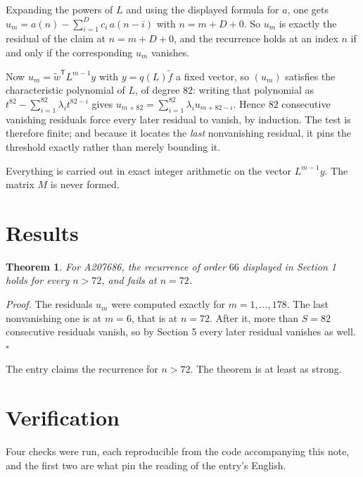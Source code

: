 \documentclass[11pt]{article}
\newtheorem{theorem}{Theorem}
\theoremstyle{definition}
\begin{document}
Expanding the powers of $L$ and using the displayed formula for $a$, one gets $u_m = a(n) - \sum_{i=1}^{D} c_i\,a(n-i)$ with $n = m + D + 0$. So $u_m$ is exactly the residual of the claim at $n = m + D + 0$, and the recurrence holds at an index $n$ if and only if the corresponding $u_m$ vanishes.

Now $u_m = \tilde w^{\mathsf T} L^{m-1} y$ with $y = q(L)\tilde f$ a fixed vector, so $(u_m)$ satisfies the characteristic polynomial of $L$, of degree $82$: writing that polynomial as $t^{82} - \sum_{i=1}^{82} \lambda_i t^{82-i}$ gives $u_{m+82} = \sum_{i=1}^{82} \lambda_i u_{m+82-i}$. Hence $82$ consecutive vanishing residuals force every later residual to vanish, by induction. The test is therefore finite; and because it locates the {\itshape last} nonvanishing residual, it pins the threshold exactly rather than merely bounding it.

Everything is carried out in exact integer arithmetic on the vector $L^{m-1}y$. The matrix $M$ is never formed.

\section{Results}

\begin{theorem} For A207686, the recurrence of order $66$ displayed in Section 1 holds for every $n > 72$, and fails at $n = 72$.\end{theorem}

{\itshape Proof.} The residuals $u_m$ were computed exactly for $m = 1,\dots,178$. The last nonvanishing one is at $m = 6$, that is at $n = 72$. After it, more than $S = 82$ consecutive residuals vanish, so by Section 5 every later residual vanishes as well. $\square$

The entry claims the recurrence for $n > 72$. The theorem is at least as strong.

\section{Verification}

Four checks were run, each reproducible from the code accompanying this note, and the first two are what pin the reading of the entry's English.
\end{document}
